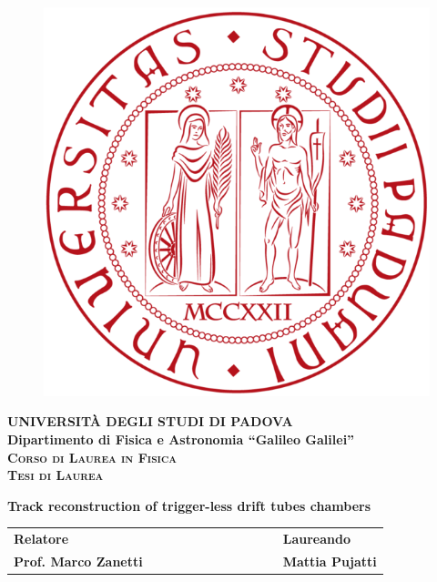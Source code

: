 \documentclass[a4paper,11pt]{book}
\begin{document}
\begin{titlepage}
\vspace{5mm}
\begin{figure}[hbtp]
\centering
\includegraphics[scale=.13]{logo_unipd.png}
\end{figure}
\vspace{5mm}
\begin{center}
{{\huge{\textsc{\bf UNIVERSIT\`A DEGLI STUDI DI PADOVA}}}\\}
\vspace{5mm}
{\Large{\bf Dipartimento di Fisica e Astronomia ``Galileo Galilei''}} \\
\vspace{5mm}
{\Large{\textsc{\bf Corso di Laurea in Fisica}}}\\
\vspace{20mm}
{\Large{\textsc{\bf Tesi di Laurea}}}\\
\vspace{30mm}
\begin{spacing}{3}
{\LARGE \textbf{Track reconstruction of trigger-less drift tubes chambers}}\\
\end{spacing}
\vspace{8mm}
\end{center}

\vspace{20mm}
\begin{spacing}{2}
\begin{tabular}{ l  c  c c c  cc c c c c  l }
{\Large{\bf Relatore}} &&&&&&&&&&& {\Large{\bf Laureando}}\\
{\Large{\bf Prof. Marco Zanetti}} &&&&&&&&&&& {\Large{\bf Mattia Pujatti}}\\
\end{tabular}
\end{spacing}
\vspace{15 mm}


\end{titlepage}
\end{document}
